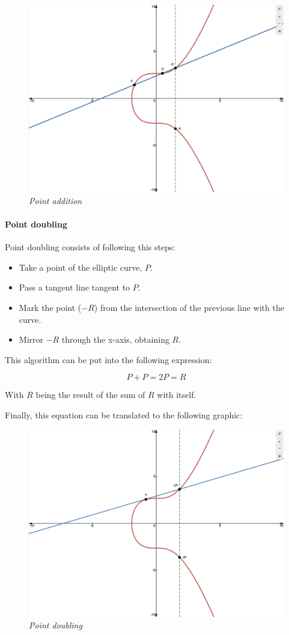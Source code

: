 \documentclass{article}
\newcommand\tab[1][1cm]{\hspace*{#1}}
\begin{document}
\begin{figure}[H]
    \begin{center}
        \includegraphics[width=0.5 \textwidth]{images/point_addition.png}
        \caption{\textit{Point addition}}
    \end{center}
\end{figure}

\paragraph{Point doubling}

\tab Point doubling consists of following this steps:

\begin{itemize}
    \item Take a point of the elliptic curve, \(P\).
    \item Pass a tangent line tangent to \(P\).
    \item Mark the point (\(-R\)) from the intersection of the previous line with the curve.
    \item Mirror \(-R\) through the x-axis, obtaining \(R\).
\end{itemize}

This algorithm can be put into the following expression:

\[P + P = 2P = R\]

With \(R\) being the result of the sum of \(R\) with itself.

Finally, this equation can be translated to the following graphic:

\begin{figure}[H]
    \begin{center}
        \includegraphics[width=0.5 \textwidth]{images/point_doubling.png}
        \caption{\textit{Point doubling}}
    \end{center}
\end{figure}
\end{document}
